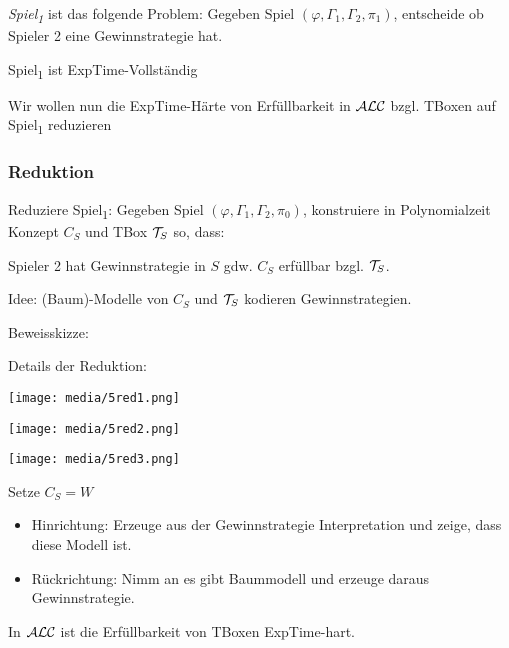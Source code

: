 \begin{definition}

\emph{Spiel\textsubscript{1}} ist das folgende Problem: Gegeben Spiel
$\left( \varphi,\Gamma_1,\Gamma_2,\pi_1 \right)$, entscheide ob
Spieler 2 eine Gewinnstrategie hat.
\end{definition}

\begin{theorem}
Spiel\textsubscript{1} ist ExpTime-Vollständig
\end{theorem}

Wir wollen nun die ExpTime-Härte von Erfüllbarkeit in $\mathcal{A}\mathcal{L}\mathcal{C}$ bzgl. TBoxen auf Spiel\textsubscript{1} reduzieren

\subsubsection{Reduktion}\label{reduktion}

Reduziere Spiel\textsubscript{1}: Gegeben Spiel
$\left( \varphi,\Gamma_1,\Gamma_2,\pi_{0} \right)$, konstruiere in
Polynomialzeit Konzept $C_{S}$ und TBox $\mathcal{T}_{S}$ so, dass: 

\begin{lemma}Spieler 2 hat Gewinnstrategie in $S$ gdw. $C_{S}$ erfüllbar bzgl. $\mathcal{T}_{S}$.\end{lemma}

Idee: (Baum)-Modelle von $C_S$ und $\mathcal{T}_S$ kodieren Gewinnstrategien.

Beweisskizze:

Details der Reduktion:

\texttt{[image: media/5red1.png]}

\texttt{[image: media/5red2.png]}

\texttt{[image: media/5red3.png]}

Setze $C_S = W$ 

\begin{itemize}
\item
  Hinrichtung: Erzeuge aus der Gewinnstrategie Interpretation und zeige, dass diese Modell ist.
\item
  Rückrichtung: Nimm an es gibt Baummodell und erzeuge daraus
  Gewinnstrategie.
\end{itemize}

\begin{theorem}
In $\mathcal{A}\mathcal{L}\mathcal{C}$ ist die Erfüllbarkeit von TBoxen ExpTime-hart.
\end{theorem}

